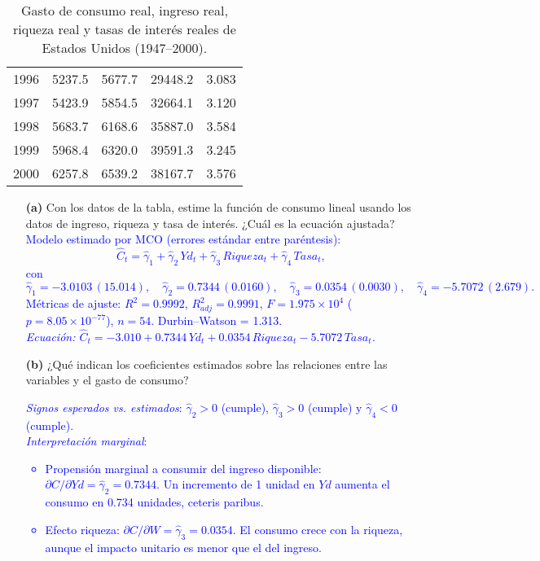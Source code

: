 \documentclass[10pt]{article}
\begin{document}
\begin{table}[H]
\begin{tabular}{lcccc}
        1996 & 5237.5 & 5677.7 & 29448.2 &   3.083 \\
        1997 & 5423.9 & 5854.5 & 32664.1 &   3.120 \\
        1998 & 5683.7 & 6168.6 & 35887.0 &   3.584 \\
        1999 & 5968.4 & 6320.0 & 39591.3 &   3.245 \\
        2000 & 6257.8 & 6539.2 & 38167.7 &   3.576 \\
        \hline
    \end{tabular}
    \caption{Gasto de consumo real, ingreso real, riqueza real y tasas de interés reales de Estados Unidos (1947--2000).}
    \label{tab:consumo_usa}
\end{table}

\begin{enumerate}
    \item[\textbf{(a)}] Con los datos de la tabla, estime la función de consumo lineal usando los datos de ingreso, riqueza y tasa
    de interés. ¿Cuál es la ecuación ajustada?\\
    \textcolor{blue}{
    Modelo estimado por MCO (errores estándar entre paréntesis):
    \[
    \widehat{C}_t=\hat\gamma_1+\hat\gamma_2\,Yd_t+\hat\gamma_3\,Riqueza_t+\hat\gamma_4\,Tasa_t,
    \]
    con $ \hat\gamma_1=-3.0103\,(15.014),\quad \hat\gamma_2=0.7344\,(0.0160),\quad \hat\gamma_3=0.0354\,(0.0030),\quad \hat\gamma_4=-5.7072\,(2.679).$ \\
    Métricas de ajuste: \(R^2=0.9992\), \(R^2_{adj}=0.9991\), \(F=1.975\times10^{4}\) (\(p=8.05\times10^{-77}\)), \(n=54\). Durbin–Watson = 1.313.\\
    \textit{Ecuación: \(\widehat{C}_t=-3.010+0.7344\,Yd_t+0.0354\,Riqueza_t-5.7072\,Tasa_t\).}
    }
    \item[\textbf{(b)}] ¿Qué indican los coeficientes estimados sobre las relaciones entre las variables y el gasto de consumo?\\
    \textcolor{blue}{ 
        \emph{Signos esperados vs. estimados}:  
        \(\hat\gamma_2>0\) (cumple), \(\hat\gamma_3>0\) (cumple) y \(\hat\gamma_4<0\) (cumple).\\
        \emph{Interpretación marginal}:  
        \begin{itemize}
        \item Propensión marginal a consumir del ingreso disponible: \(\partial C/\partial Yd=\hat\gamma_2=0.7344\). Un incremento de 1 unidad en \(Yd\) aumenta el consumo en 0.734 unidades, ceteris paribus.
        \item Efecto riqueza: \(\partial C/\partial W=\hat\gamma_3=0.0354\). El consumo crece con la riqueza, aunque el impacto unitario es menor que el del ingreso.

\end{itemize}}
\end{enumerate}
\end{document}
